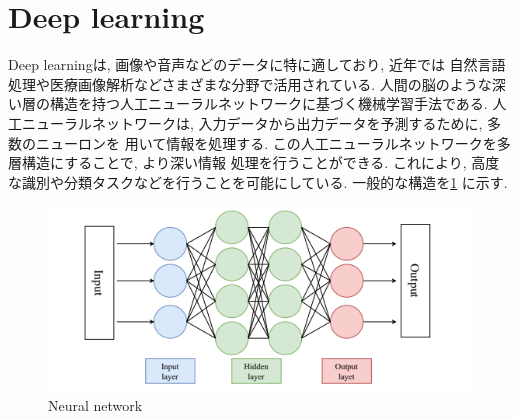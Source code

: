 
\section{Deep learning}
Deep learningは, 画像や音声などのデータに特に適しており, 近年では
自然言語処理や医療画像解析などさまざまな分野で活用されている.
人間の脳のような深い層の構造を持つ人工ニューラルネットワークに基づく機械学習手法である. 
人工ニューラルネットワークは, 入力データから出力データを予測するために, 多数のニューロンを
用いて情報を処理する. この人工ニューラルネットワークを多層構造にすることで, より深い情報
処理を行うことができる. これにより, 高度な識別や分類タスクなどを行うことを可能にしている. 
一般的な構造を\ref{Fig:Neural network} に示す.


\begin{figure}[hbtp]
  \centering
 \includegraphics[keepaspectratio, scale=0.4]
      {images/deeplearning_model.png}
 \caption{Neural network}
 \label{Fig:Neural network}
\end{figure}

\newpage
